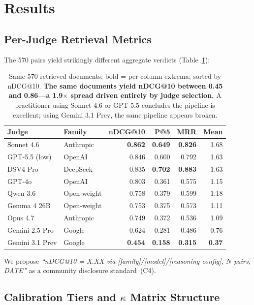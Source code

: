 \documentclass[11pt,letterpaper]{article}
\begin{document}
\section{Results}\label{sec:results}

\subsection{Per-Judge Retrieval Metrics}

The 570 pairs yield strikingly different aggregate verdicts (Table~\ref{tab:perjudge}):

\begin{table}[h]
\small
\centering
\begin{tabular}{@{}llrrrr@{}}
\toprule
Judge & Family & nDCG@10 & P@5 & MRR & Mean \\
\midrule
Sonnet 4.6 & Anthropic & \textbf{0.862} & \textbf{0.649} & \textbf{0.826} & 1.68 \\
GPT-5.5 (low) & OpenAI & 0.846 & 0.600 & 0.792 & 1.63 \\
DSV4 Pro & DeepSeek & 0.835 & \textbf{0.702} & \textbf{0.883} & 1.63 \\
GPT-4o & OpenAI & 0.803 & 0.361 & 0.575 & 1.15 \\
Qwen 3.6 & Open-weight & 0.758 & 0.379 & 0.599 & 1.18 \\
Gemma 4 26B & Open-weight & 0.753 & 0.375 & 0.573 & 1.11 \\
Opus 4.7 & Anthropic & 0.749 & 0.372 & 0.536 & 1.09 \\
Gemini 2.5 Pro & Google & 0.624 & 0.281 & 0.486 & 0.76 \\
Gemini 3.1 Prev & Google & \textbf{0.454} & \textbf{0.158} & \textbf{0.315} & \textbf{0.37} \\
\bottomrule
\end{tabular}
\caption{Same 570 retrieved documents; bold = per-column extrema; sorted by nDCG@10. \textbf{The same documents yield nDCG@10 between 0.45 and 0.86---a 1.9$\times$ spread driven entirely by judge selection.} A practitioner using Sonnet 4.6 or GPT-5.5 concludes the pipeline is excellent; using Gemini 3.1 Prev, the same pipeline appears broken.}
\label{tab:perjudge}
\end{table}

We propose \emph{``nDCG@10 = X.XX via [family]/[model]/[reasoning-config], $N$ pairs, DATE''} as a community disclosure standard~(C4).

\subsection{Calibration Tiers and $\kappa$ Matrix Structure}\label{sec:tiers}
\end{document}
